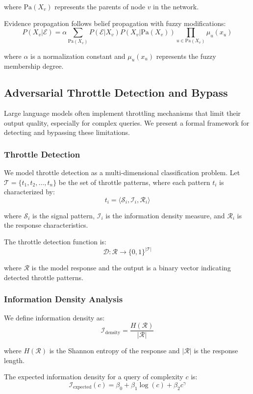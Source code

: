 \documentclass[12pt,a4paper]{article}
\begin{document}
where $\text{Pa}(X_v)$ represents the parents of node $v$ in the network.

Evidence propagation follows belief propagation with fuzzy modifications:
$$P(X_v | \mathcal{E}) = \alpha \sum_{\text{Pa}(X_v)} P(\mathcal{E} | X_v) P(X_v | \text{Pa}(X_v)) \prod_{u \in \text{Pa}(X_v)} \mu_u(x_u)$$

where $\alpha$ is a normalization constant and $\mu_u(x_u)$ represents the fuzzy membership degree.

\subsection{Adversarial Throttle Detection and Bypass}

Large language models often implement throttling mechanisms that limit their output quality, especially for complex queries. We present a formal framework for detecting and bypassing these limitations.

\subsubsection{Throttle Detection}

We model throttle detection as a multi-dimensional classification problem. Let $\mathcal{T} = \{t_1, t_2, \ldots, t_n\}$ be the set of throttle patterns, where each pattern $t_i$ is characterized by:
$$t_i = \langle \mathcal{S}_i, \mathcal{I}_i, \mathcal{R}_i \rangle$$

where $\mathcal{S}_i$ is the signal pattern, $\mathcal{I}_i$ is the information density measure, and $\mathcal{R}_i$ is the response characteristics.

The throttle detection function is:
$$\mathcal{D}: \mathcal{R} \rightarrow \{0, 1\}^{|\mathcal{T}|}$$

where $\mathcal{R}$ is the model response and the output is a binary vector indicating detected throttle patterns.

\subsubsection{Information Density Analysis}

We define information density as:
$$\mathcal{I}_{\text{density}} = \frac{H(\mathcal{R})}{|\mathcal{R}|}$$

where $H(\mathcal{R})$ is the Shannon entropy of the response and $|\mathcal{R}|$ is the response length.

The expected information density for a query of complexity $c$ is:
$$\mathcal{I}_{\text{expected}}(c) = \beta_0 + \beta_1 \log(c) + \beta_2 c^{\gamma}$$
\end{document}

